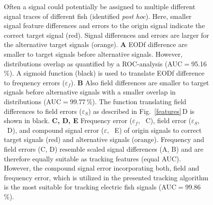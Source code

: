 \documentclass[11pt,pdftex]{article}
\newcommand{\figitem}[1]{\textsf{\bfseries\uppercase{#1}}\penalty10000 }
\newcommand{\panel}[1]{\textsf{#1}}
\newcommand{\subfref}[2]{\textup{\ref{#1}}\,\panel{#2}}
\newcommand{\fig}{Fig.}
\newcommand{\subfigref}[2]{\fig~\subfref{#1}{#2}}
\begin{document}
\begin{figure}[t]
\begin{minipage}[t]{0.45\textwidth}
  \caption{\label{signal_diff_error} Often a signal could potentially be assigned to multiple different signal traces of different fish (identified \textit{post hoc}). Here, smaller signal feature differences and errors to the origin signal indicate the correct target signal (red). Signal differences and errors are larger for the alternative target signals (orange). \figitem{A} EODf difference are smaller to target signals before alternative signals. However, distributions overlap as quantified by a ROC-analysis (AUC$=$95.16\,\%). A sigmoid function (black) is used to translate EODf difference to frequency errors ($\varepsilon_{f}$). \figitem{B} Also field differences are smaller to target signals before alternative signals with a smaller overlap in distributions (AUC$=$99.77\,\%). The function translating field differences to field errors ($\varepsilon_{S}$) as described in \subfigref{features}{D} is shown in black. \figitem{C, D, E} Frequency error ($\varepsilon_{f}$, \panel~C), field error ($\varepsilon_{S}$, \panel~D), and compound signal error ($\varepsilon$, \panel~E) of origin signals to correct target signals (red) and alternative signals (orange). Frequency and field errors (C, D) resemble scaled signal differences (A, B) and are therefore equally suitable as tracking features (equal AUC). However, the compound signal error incorporating both, field and frequency error, which is utilized in the presented tracking algorithm is the most suitable for tracking electric fish signals (AUC$=$99.86\,\%).
  }
  \end{minipage}
\end{figure}

\end{document}
